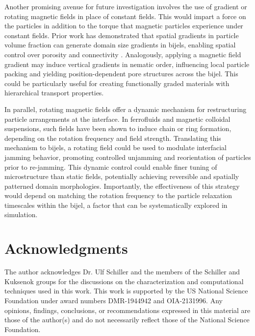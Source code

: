 Another promising avenue for future investigation involves the use of gradient or rotating magnetic fields in place of constant fields. This
would impart a force on the particles in addition to the torque that magnetic particles experience under constant fields. \cite{spatafora-salazar_hierarchical_2021, martinezpedrero_collective_2020}
Prior work has demonstrated that spatial gradients in particle volume fraction can generate domain size gradients in bijels, enabling spatial 
control over porosity and connectivity \cite{french_bicontinuous_2022}. Analogously, applying a magnetic field gradient may induce vertical 
gradients in nematic order, influencing local particle packing and yielding position-dependent pore structures across the bijel. This could be 
particularly useful for creating functionally graded materials with hierarchical transport properties.

In parallel, rotating magnetic fields offer a dynamic mechanism for restructuring particle arrangements at the interface. 
\cite{spatafora-salazar_hierarchical_2021, martinezpedrero_collective_2020}
In ferrofluids and magnetic colloidal suspensions, such fields have been shown to induce chain or ring formation, depending on the rotation frequency and field 
strength. \cite{spatafora-salazar_hierarchical_2021, martinezpedrero_collective_2020}
Translating this mechanism to bijels, a rotating field could be used to modulate interfacial jamming behavior, promoting controlled 
unjamming and reorientation of particles prior to re-jamming. This dynamic control could enable finer tuning of microstructure than static fields, 
potentially achieving reversible and spatially patterned domain morphologies. Importantly, the effectiveness of this strategy would depend on 
matching the rotation frequency to the particle relaxation timescales within the bijel, a factor that can be systematically explored in simulation.

\section{Acknowledgments}

The author acknowledges Dr. Ulf Schiller and the members of the Schiller and Kuksenok groups for the discussions on 
the characterization and computational techniques used in this work. This work is supported by the US National Science 
Foundation under award numbers DMR-1944942 and OIA-2131996. Any opinions, findings, conclusions, or recommendations 
expressed in this material are those of the author(s) and do not necessarily reflect those of the National Science 
Foundation.  

